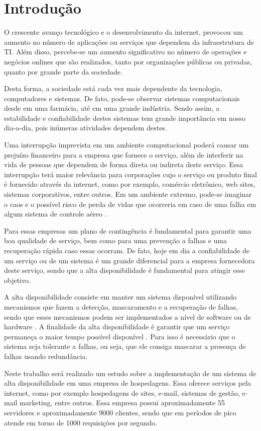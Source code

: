 \chapter{Introdução}
O crescente avanço tecnológico e o desenvolvimento da internet, provocou um aumento no número de aplicações ou serviços que dependem da infraestrutura de TI. Além disso, percebe-se um aumento significativo no número de operações e negócios onlines que são realizados, tanto por organizações públicas ou privadas, quanto por grande parte da sociedade.

Desta forma, a sociedade está cada vez mais dependente da tecnologia, computadores e sistemas. De fato, pode-se observar sistemas computacionais desde em uma farmácia, até em uma grande indústria. Sendo assim, a estabilidade e confiabilidade destes sistemas tem grande importância em nosso dia-a-dia, pois inúmeras atividades dependem destes.

Uma interrupção imprevista em um ambiente computacional poderá causar um prejuízo financeiro para a empresa que fornece o serviço, além de interferir na vida de pessoas que dependem de forma direta ou indireta deste serviço. Essa interrupção terá maior relevância para corporações cujo o serviço ou produto final é fornecido através da internet, como por exemplo, comércio eletrônico, web sites, sistemas corporativos, entre outros. Em um ambiente extremo, pode-se imaginar o caos e o possível risco de perda de vidas que ocorreria em caso de uma falha em algum sistema de controle aéreo \cite{costa2009}.

Para essas empresas um plano de contingência é fundamental para garantir uma boa qualidade de serviço, bem como para uma prevenção a falhas e uma recuperação rápida caso essas ocorram. De fato, hoje em dia a confiabilidade de um serviço ou de um sistema é um grande diferencial para a empresa fornecedora deste serviço, sendo que a alta disponibilidade é fundamental para atingir esse objetivo.

A alta disponibilidade consiste em manter um sistema disponível utilizando mecanismos que fazem a detecção, mascaramento e a recuperação de falhas, sendo que esses mecanismos podem ser implementados a nível de software ou de hardware \cite{reis2009}. A finalidade da alta disponibilidade é garantir que um serviço permaneça o maior tempo possível disponível \cite{goncalves2009}. Para isso é necessário que o sistema seja tolerante a falhas, ou seja, que ele consiga mascarar a presença de falhas usando redundância.

Neste trabalho será realizado um estudo sobre a implementação de um sistema de alta disponibilidade em uma empresa de hospedagens. Essa oferece serviços pela internet, como por exemplo hospedagens de sites, e-mail, sistemas de gestão, e-mail marketing, entre outros. Essa empresa possui aproximadamente 55 servidores e aproximadamente 9000 clientes, sendo que em períodos de pico atende em torno de 1000 requisições por segundo. 

